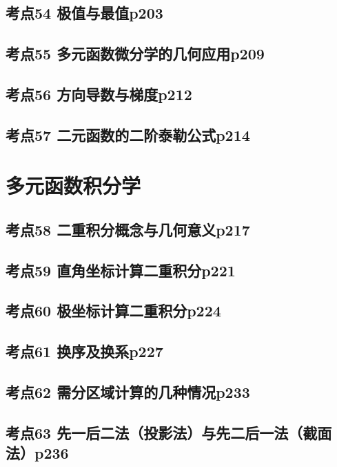 \section{考点54 极值与最值p203}

\section{考点55 多元函数微分学的几何应用p209}

\section{考点56 方向导数与梯度p212}

\section{考点57 二元函数的二阶泰勒公式p214}

\chapter{多元函数积分学}

\section{考点58 二重积分概念与几何意义p217}

\section{考点59 直角坐标计算二重积分p221}

\section{考点60 极坐标计算二重积分p224}

\section{考点61 换序及换系p227}

\section{考点62 需分区域计算的几种情况p233}

\section{考点63 先一后二法（投影法）与先二后一法（截面法）p236}

